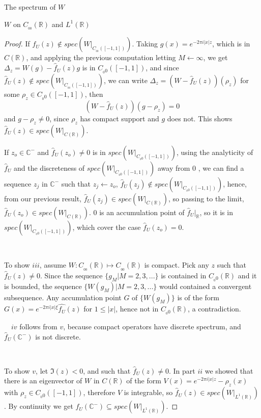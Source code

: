 \documentclass[12pt]{article}
\begin{document}
\begin{section}{The spectrum of $W$ }
\begin{subsection}{$W$ on $C_{_{0\!0}}(\mathbb{R})$ and $L^1(\mathbb{R})$}
\begin{proof}
If $\hat{f}_U(z) \notin spec\left(W\Big|_{C_{_{0\!0}}([-1,1])}   \right) $. Taking $g(x) = e^{-2 \pi i |x| z}$, which is in $C(\mathbb{R})$, and applying the previous computation letting $M \leftarrow \infty$, we get $\Delta_z = W(g) - \hat{f}_U(z)g$ is in $C_{_0\!0}([-1,1])$, and since $\hat{f}_U(z) \notin spec\left(W\Big|_{C_{_{0\!0} }([-1,1])}   \right) $, we can write $\Delta_z = (W - \hat{f}_U(z))(\rho_z) $ for some $\rho_z \in C_{_0\!0}([-1,1])$, then
$$
(W - \hat{f}_U(z))(g - \rho_z) = 0
$$
and $g - \rho_z \ne 0$, since $\rho_z$ has compact support and $g$ does not. This shows $\hat{f}_U(z) \in spec\left(W\Big|_{C(\mathbb{R})}   \right) $.  

If $z_o \in \mathbb{C}^-$ and $\hat{f}_U(z_o) \ne 0$ is in $spec\left(W\Big|_{C_{_0\!0}([-1,1])}   \right) $,  using the analyticity of $\hat{f}_U$ and the discreteness of $spec\left(W\Big|_{C_{_0\!0}([-1,1])}   \right) $ away from $0$ , we can find a sequence ${z_j}$ in $\mathbb{C}^-$ such that $z_j \leftarrow z_o$, $\hat{f}_U(z_j) \notin spec\left(W\Big|_{C_{_0\!0}([-1,1])}   \right) $, hence, from our previous result, $\hat{f}_U(z_j) \in spec\left(W\Big|_{C(\mathbb{R})}   \right) $, so passing to the limit, $\hat{f}_U(z_o) \in spec\left(W\Big|_{C(\mathbb{R})}   \right) $. $0$ is an accumulation point of $\hat{f}_U\Big|_{\mathbb{R}}$, so it is in $spec\left(W\Big|_{C_{_0\!0}([-1,1])}   \right) $, which cover the case $\hat{f}_U(z_o) = 0$.  

\  
\  

To show $iii$, assume $W: C_{_{0\!0}}(\mathbb{R}) \longmapsto C_{_{0\!0}}(\mathbb{R}) $ is compact. Pick any $z$ such that $\hat{f}_U(z) \ne 0$. Since the sequence  $\{g_M | M=2,3,...\}$ is contained in $ C_{_0\!0}(\mathbb{R})$ and it is bounded, the sequence $\{W(g_M) | M=2,3,...\}$ would contained a convergent subsequence. Any accumulation point $G$ of $\{W(g_M)\}$ is of the form $G(x) =  e^{-2 \pi i |x| \xi} \hat{f_U}(z) $ for $1 \le |x|$, hence not in $ C_{_0\!0}(\mathbb{R})$, a contradiction. 

\  
\  
$iv$ follows from $v$, because compact operators have discrete spectrum, and $\hat{f}_U(\mathbb{C}^-)$ is not discrete.  

\  
\  

To show $v$, let $\Im(z)<0$, and such that $\hat{f}_U(z) \ne 0$. In part $ii$ we showed that there is an eigenvector of $W$ in $C(\mathbb{R})$ of the form $V(x) = e^{-2 \pi i |x| z} - \rho_z(x)$ with $\rho_z \in C_{_0\!0}([-1,1])$, therefore $V$ is integrable, so $\hat{f}_U(z) \in spec(W\Big|_{L^1(\mathbb{R})}) $. By continuity we get $\hat{f}_U(\mathbb{C}^-) \subseteq spec(W\Big|_{L^1(\mathbb{R})}) $.  


\end{proof}
\end{subsection}
\end{section}
\end{document}
